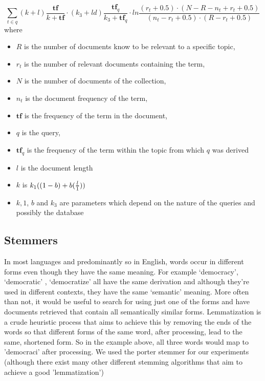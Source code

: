 \begin{equation}
 \sum\limits_{t \in q} (k+l)\frac{\bm{tf}}{k+\bm{tf}} \cdot (k_3+ld) \frac{\bm{tf}_q}{k_3 + \bm{tf}_q} \cdot ln\frac{ (r_t +0.5) \cdot (N-R-n_t+r_t+0.5) }{(n_t-r_t+0.5) \cdot (R-r_t+0.5)}
\end{equation}
where
\begin{itemize}
\item $R$ is the number of documents know to be relevant to a specific topic,
\item $r_t$ is the number of relevant documents containing the term,
\item $N$ is the number of documents of the collection, 
\item $n_t$ is the document frequency of the term,
\item $\bm{tf}$ is the frequency of the term in the document,
\item $q$ is the query,
\item $\bm{tf}_q$ is the frequency of the term within the topic from which $q$ was derived
\item $l$ is the document length
\item $k$ is $k_1( ( 1-b ) + b( \Tfrac{l}{1} ) )$
\item $k,1$, $b$ and $k_3$ are parameters which depend on the nature of the queries and possibly the database

\end{itemize}

\subsection{Stemmers}

In most languages and predominantly so in English, words occur in different forms even though they have the same meaning. For example \lq democracy', \lq democratic' , \lq democratize' all have the same derivation and although they're used in different contexts, they have the same \lq semantic' meaning. More often than not, it would be useful to search for using just one of the forms and have documents retrieved that contain all semantically similar forms. Lemmatization is a crude heuristic process that aims to achieve this by removing the ends of the words so that different forms of the same word, after processing, lead to the same, shortened form. So in the example above, all three words would map to ’democraci’ after processing. We used the porter stemmer \citep{porter1980algorithm} for our experiments (although there exist many other different stemming algorithms that aim to achieve a good ’lemmatization’)

